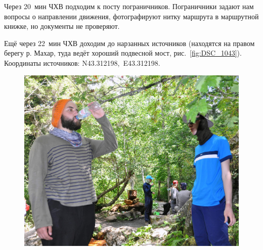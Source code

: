 Через 20~мин ЧХВ подходим к посту пограничников. Пограничники задают нам вопросы о направлении движения, фотографируют нитку маршрута в маршрутной книжке, но документы не проверяют.

Ещё через 22~мин ЧХВ доходим до нарзанных источников (находятся на правом берегу р. Махар, туда ведёт хороший подвесной мост, рис.~\ref{fig:DSC_1043}). Координаты источников: N43.312198\degree,~E43.312198\degree.

\begin{figure}[h!]
	\centering
	\begin{minipage}[h]{0.62\linewidth}
		\includegraphics[width=\linewidth]{../pics/DSC_1043.jpg}
	\end{minipage}
	\quad
	\begin{minipage}[h]{0.35\linewidth}

\end{minipage}
\end{figure}
